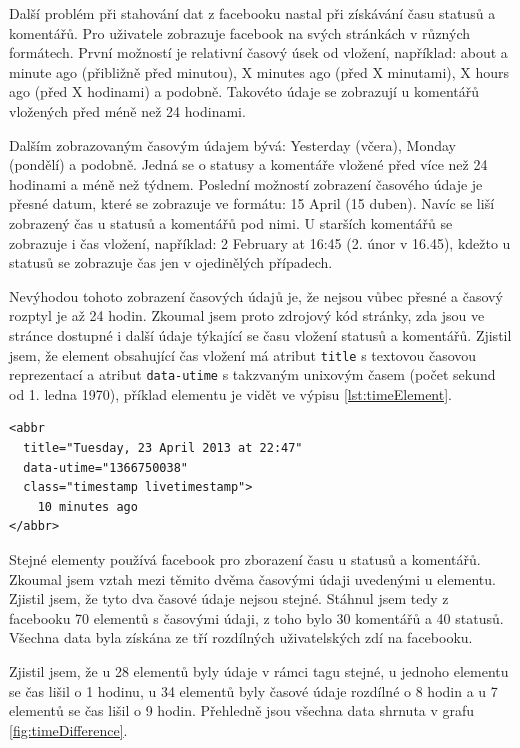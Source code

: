 \documentclass[thesis=M,czech]{FITthesis}[2013/05/10]
\begin{document}
Další problém při stahování dat z facebooku nastal při získávání času statusů a komentářů. Pro uživatele zobrazuje facebook na svých stránkách v různých formátech. První možností je relativní časový úsek od vložení, například: about a minute ago (přibližně před minutou), X minutes ago (před X minutami), X hours ago (před X hodinami) a podobně. Takovéto údaje se zobrazují u komentářů vložených před méně než 24 hodinami. 

Dalším zobrazovaným časovým údajem bývá: Yesterday (včera), Monday (pondělí) a podobně. Jedná se o statusy a komentáře vložené před více než 24 hodinami a méně než týdnem. Poslední možností zobrazení časového údaje je přesné datum, které se zobrazuje ve formátu: 15 April (15 duben). Navíc se liší zobrazený čas u statusů a komentářů pod nimi. U starších komentářů se zobrazuje i čas vložení, například: 2 February at 16:45 (2. únor v 16.45), kdežto u statusů se zobrazuje čas jen v ojedinělých případech.

Nevýhodou tohoto zobrazení časových údajů je, že nejsou vůbec přesné a časový rozptyl je až 24 hodin. Zkoumal jsem proto zdrojový kód stránky, zda jsou ve stránce dostupné i další údaje týkající se času vložení statusů a komentářů. Zjistil jsem, že element obsahující čas vložení má atribut \verb|title| s textovou časovou reprezentací a atribut \verb|data-utime| s takzvaným unixovým časem (počet sekund od 1. ledna 1970), příklad elementu je vidět ve výpisu \ref{lst:timeElement}. 

\begin{lstlisting}[caption={Příklad elementu obsahující čas},label=lst:timeElement,belowcaptionskip=0.4cm]
<abbr 
  title="Tuesday, 23 April 2013 at 22:47"
  data-utime="1366750038" 
  class="timestamp livetimestamp">
    10 minutes ago
</abbr>
\end{lstlisting}

Stejné elementy používá facebook pro zborazení času u statusů a komentářů. Zkoumal jsem vztah mezi těmito dvěma časovými údaji uvedenými u elementu. Zjistil jsem, že tyto dva časové údaje nejsou stejné. Stáhnul jsem tedy z facebooku 70 elementů s časovými údaji, z toho bylo 30 komentářů a 40 statusů. Všechna data byla získána ze tří rozdílných uživatelských zdí na facebooku. 

Zjistil jsem, že u 28 elementů byly údaje v rámci tagu stejné, u jednoho elementu se čas lišil o 1 hodinu, u 34 elementů byly časové údaje rozdílné o 8 hodin a u 7 elementů se čas lišil o 9 hodin. Přehledně jsou všechna data shrnuta v grafu \ref{fig:timeDifference}.
\end{document}
